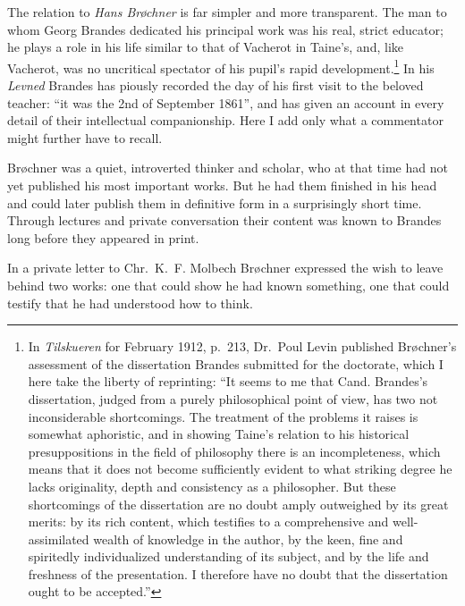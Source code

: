 \documentclass[12pt,a4paper,openany]{book}
\newcommand{\opage}[1]{\marginnote{\footnotesize\textit{[#1]}}}
\begin{document}
The relation to \emph{Hans Brøchner} is far simpler and more transparent. The man to whom Georg Brandes dedicated
his principal work was his real, strict educator; he plays a role in his life similar to that of Vacherot in
Taine's, %
and, like Vacherot, was no uncritical spectator of his pupil's rapid
development.\footnote{In \textit{Tilskueren} for February 1912, p.~213, Dr.~Poul Levin published Brøchner's
assessment of the dissertation Brandes submitted for the doctorate, which I here take the liberty of reprinting:
``It seems to me that Cand. Brandes's dissertation, judged from a purely philosophical point of view, has two not
inconsiderable shortcomings. The treatment of the problems it raises is somewhat aphoristic, and in showing Taine's
relation to his historical presuppositions in the field of philosophy there is an incompleteness, which means that
it does not become sufficiently evident to what striking degree he lacks originality, depth and consistency as a
philosopher. But these shortcomings of the dissertation are no doubt amply outweighed by its great merits: by its
rich content, which testifies to a comprehensive and well-assimilated wealth of knowledge in the author, by the
keen, fine and spiritedly individualized understanding of its subject, and by the life and freshness of the
presentation. I therefore have no doubt that the dissertation ought to be accepted.''}
In his \textit{Levned} Brandes has piously recorded the day of his first visit to the beloved teacher: ``it was the
2nd of September 1861'', and has given an account in every detail of their intellectual companionship. Here I add
only what a commentator might further have to recall.

Brøchner was a quiet, introverted thinker and scholar, who
\opage{153}\setcounter{footnote}{0}%
at that time had not yet published his most important works. But he had them finished in his head and could later
publish them in definitive form in a surprisingly short time. Through lectures and private conversation their
content was known to Brandes long before they appeared in print.

In a private letter to Chr.~K.~F. Molbech Brøchner expressed the wish to leave behind two works: one that could show
he had known something, one that could testify that he had understood how to think.
\end{document}
